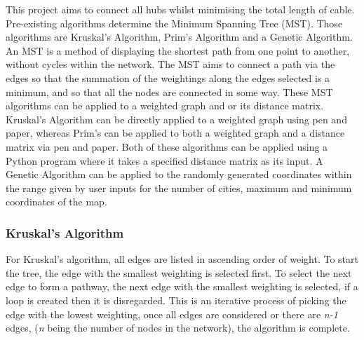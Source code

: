 \documentclass[twocolumn]{article}
\begin{document}
This project aims to connect all hubs whilst minimising the total length of cable. Pre-existing algorithms determine the Minimum Spanning Tree (MST). Those algorithms are Kruskal’s Algorithm, Prim’s Algorithm and a Genetic Algorithm.
An MST is a method of displaying the shortest path from one point to another, without cycles within the network. The MST aims to connect a path via the edges so that the summation of the weightings along the edges selected is a minimum, and so that all the nodes are connected in some way.
These MST algorithms can be applied to a weighted graph and or its distance matrix. Kruskal’s Algorithm can be directly applied to a weighted graph using pen and paper, whereas Prim’s can be applied to both a weighted graph and a distance matrix via pen and paper. Both of these algorithms can be applied using a Python program where it takes a specified distance matrix as its input. A Genetic Algorithm can be applied to the randomly generated coordinates within the range given by user inputs for the number of cities, maximum and minimum coordinates of the map.


\subsubsection{Kruskal's Algorithm}
For Kruskal’s algorithm, all edges are listed in ascending order of weight. To start the tree, the edge with the smallest weighting is selected first. To select the next edge to form a pathway, the next edge with the smallest weighting is selected, if a loop is created then it is disregarded. This is an iterative process of picking the edge with the lowest weighting, once all edges are considered or there are \textit{n-1} edges, (\textit{n} being the number of nodes in the network), the algorithm is complete.
\end{document}
